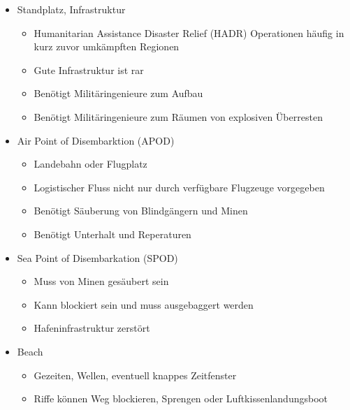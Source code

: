 {}\documentclass[a4paper]{article}
\providecommand{\tightlist}{\setlength{\itemsep}{1mm}\setlength{\parskip}{1mm}}
\begin{document}
\begin{itemize}
	\tightlist
	\item
	      Standplatz, Infrastruktur

	      \begin{itemize}
		      \tightlist
		      \item
		            Humanitarian Assistance Disaster Relief (HADR) Operationen häufig in
		            kurz zuvor umkämpften Regionen
		      \item
		            Gute Infrastruktur ist rar
		      \item
		            Benötigt Militäringenieure zum Aufbau
		      \item
		            Benötigt Militäringenieure zum Räumen von explosiven Überresten
	      \end{itemize}
	\item
	      Air Point of Disembarktion (APOD)

	      \begin{itemize}
		      \tightlist
		      \item
		            Landebahn oder Flugplatz
		      \item
		            Logistischer Fluss nicht nur durch verfügbare Flugzeuge vorgegeben
		      \item
		            Benötigt Säuberung von Blindgängern und Minen
		      \item
		            Benötigt Unterhalt und Reperaturen
	      \end{itemize}
	\item
	      Sea Point of Disembarkation (SPOD)

	      \begin{itemize}
		      \tightlist
		      \item
		            Muss von Minen gesäubert sein
		      \item
		            Kann blockiert sein und muss ausgebaggert werden
		      \item
		            Hafeninfrastruktur zerstört
	      \end{itemize}
	\item
	      Beach

	      \begin{itemize}
		      \tightlist
		      \item
		            Gezeiten, Wellen, eventuell knappes Zeitfenster
		      \item
		            Riffe können Weg blockieren, Sprengen oder Luftkissenlandungsboot
	      \end{itemize}
\end{itemize}
\end{document}
